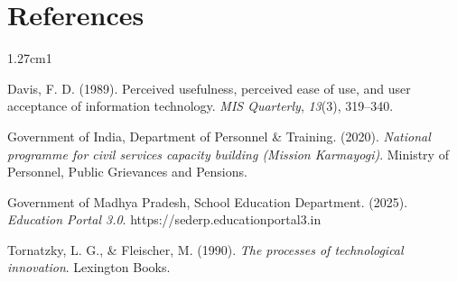 \documentclass[11pt,a4paper]{article}
\begin{document}
\section{References}

\vspace{0.2cm}
\small\setlength{\parindent}{0pt}\singlespacing
\begin{hangparas}{1.27cm}{1}

Davis, F. D. (1989). Perceived usefulness, perceived ease of use, and user
acceptance of information technology. \textit{MIS Quarterly}, \textit{13}(3), 319--340.

\vspace{4pt}
Government of India, Department of Personnel \& Training. (2020).
\textit{National programme for civil services capacity building (Mission Karmayogi)}.
Ministry of Personnel, Public Grievances and Pensions.

\vspace{4pt}
Government of Madhya Pradesh, School Education Department. (2025).
\textit{Education Portal 3.0}. https://sederp.educationportal3.in

\vspace{4pt}
Tornatzky, L. G., \& Fleischer, M. (1990).
\textit{The processes of technological innovation}. Lexington Books.

\end{hangparas}
\end{document}
